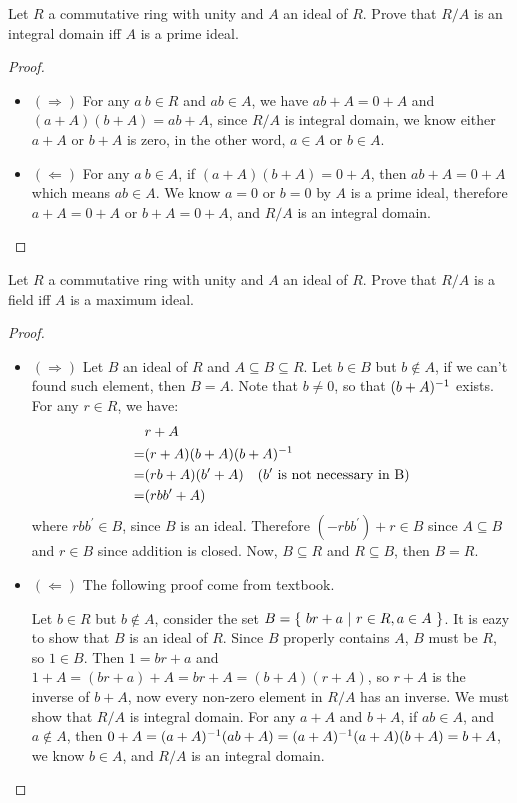 \documentclass[../main.tex]{subfiles}
\begin{document}
\begin{theorem}
  Let $R$ a commutative ring with unity and $A$ an ideal of $R$. Prove that
  $R/A$ is an integral domain iff $A$ is a prime ideal.
\end{theorem}
\begin{proof}
  ~
  \begin{itemize}
    \item $(\Rightarrow)$ For any $a \ b \in R$ and $ab \in A$,
      we have $ab + A = 0 + A$ and $(a + A)(b + A) = ab + A$,
      since $R/A$ is integral domain, we know either $a + A$ or $b + A$ is
      zero, in the other word, $a \in A$ or $b \in A$.
    \item $(\Leftarrow)$ For any $a \ b \in A$, if $(a + A)(b + A) = 0 + A$,
      then $ab + A = 0 + A$ which means $ab \in A$.
      We know $a = 0$ or $b = 0$ by $A$ is a prime ideal,
      therefore $a + A = 0 + A$ or $b + A = 0 + A$, and $R/A$ is an integral domain.
  \end{itemize}
\end{proof}

\begin{theorem}
  Let $R$ a commutative ring with unity and $A$ an ideal of $R$. Prove that
  $R/A$ is a field iff $A$ is a maximum ideal.
\end{theorem}
\begin{proof}
  ~
  \begin{itemize}
    \item $(\Rightarrow)$ Let $B$ an ideal of $R$ and $A \subseteq B \subseteq R$.
      Let $b \in B$ but $b \notin A$, if we can't found such element, then $B = A$.
      Note that $b \neq 0$, so that $(b + A)^{-1}$ exists.
      For any $r \in R$, we have:
      \begin{align*}
         & r + A \\
        =& (r + A)(b + A)(b + A)^{-1} \\
        =& (rb + A)(b^\prime + A) \quad \text{($b^\prime$ is not necessary in B)} \\
        =& (rbb^\prime + A)
      \end{align*}
      where $rbb^\prime \in B$, since $B$ is an ideal.
      Therefore $(- rbb^\prime) + r \in B$ since $A \subseteq B$
      and $r \in B$ since addition is closed.
      Now, $B \subseteq R$ and $R \subseteq B$, then $B = R$.
    \item $(\Leftarrow)$ The following proof come from textbook. \par
      Let $b \in R$ but $b \notin A$, consider the set $B = \{ \ br + a \ | \ r \in R, a \in A \ \}$.
      It is eazy to show that $B$ is an ideal of $R$. Since $B$ properly contains $A$,
      $B$ must be $R$, so $1 \in B$. Then $1 = br + a$ and
      $1 + A = (br + a) + A = br + A = (b + A)(r + A)$,
      so $r + A$ is the inverse of $b + A$, now every non-zero element in $R/A$ has an inverse.
      We must show that $R/A$ is integral domain.
      For any $a + A$ and $b + A$, if $ab \in A$, and $a \notin A$,
      then $0 + A = (a + A)^{-1}(ab + A) = (a + A)^{-1}(a + A)(b + A) = b + A$,
      we know $b \in A$, and $R/A$ is an integral domain.
  \end{itemize}
\end{proof}
\end{document}
